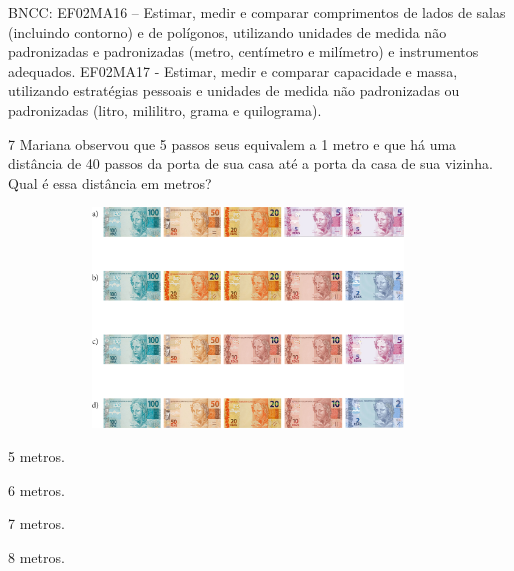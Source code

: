 \begin{escolha}
\begin{escolha}
{BNCC: EF02MA16 -- Estimar, medir e comparar comprimentos de lados de
salas (incluindo contorno) e de polígonos, utilizando unidades de medida
não padronizadas e padronizadas (metro, centímetro e milímetro) e
instrumentos adequados. EF02MA17 - Estimar, medir e comparar capacidade
e massa, utilizando estratégias pessoais e unidades de medida não
padronizadas ou padronizadas (litro, mililitro, grama e quilograma).}

\num{7} Mariana observou que 5 passos seus equivalem a 1 metro e que há uma
distância de 40 passos da porta de sua casa até a porta da casa de sua vizinha. Qual é essa distância em metros?

\includegraphics[width=5.00000in,height=2.30208in]{media/image115.png}


\begin{minipage}{.5\textwidth}
\begin{escolha}
\item 5 metros.

\item 6 metros.

\item 7 metros.

\item 8 metros.
\end{escolha}
\end{minipage}


\end{escolha}
\end{escolha}
